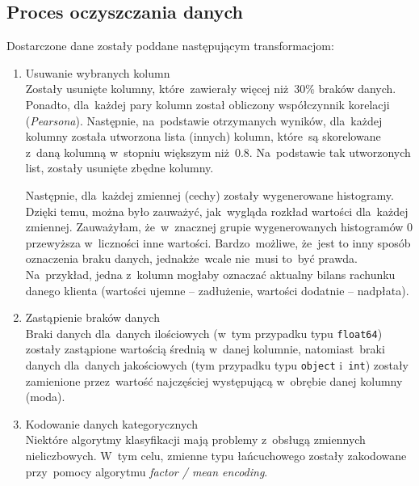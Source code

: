 \documentclass[11pt, a4paper]{article}
\begin{document}
\subsection{Proces oczyszczania danych}
Dostarczone dane zostały poddane następującym transformacjom:
\begin{enumerate}
    \item Usuwanie wybranych kolumn \\
    Zostały usunięte kolumny, które~zawierały więcej niż~$30\%$ braków danych. Ponadto, dla~każdej pary kolumn został obliczony współczynnik korelacji (\textit{Pearsona}). Następnie, na~podstawie otrzymanych wyników, dla~każdej kolumny została utworzona lista (innych) kolumn, które~są skorelowane z~daną kolumną w~stopniu większym niż~$0.8$. Na~podstawie tak utworzonych list, zostały usunięte zbędne kolumny.
    
    Następnie, dla~każdej zmiennej (cechy) zostały wygenerowane histogramy. Dzięki temu, można było zauważyć, jak~wygląda rozkład wartości dla~każdej zmiennej. Zauważyłam, że~w~znacznej grupie wygenerowanych histogramów $0$ przewyższa w~liczności inne wartości. Bardzo~możliwe, że~jest to inny sposób oznaczenia braku danych, jednakże~wcale nie~musi to~być prawda. Na~przykład, jedna z~kolumn mogłaby oznaczać aktualny bilans rachunku danego klienta (wartości ujemne -- zadłużenie, wartości dodatnie -- nadpłata).
    
    \item Zastąpienie braków danych \\
    Braki danych dla~danych ilościowych (w~tym przypadku typu \texttt{float64}) zostały zastąpione wartością średnią w~danej kolumnie, natomiast~braki danych dla~danych jakościowych (tym przypadku typu \texttt{object} i~\texttt{int}) zostały zamienione przez~wartość najczęściej występującą w~obrębie danej kolumny (moda).
    
    \item Kodowanie danych kategorycznych \\
    Niektóre algorytmy klasyfikacji mają problemy z~obsługą zmiennych nieliczbowych. W~tym celu, zmienne typu łańcuchowego zostały zakodowane przy~pomocy algorytmu \textit{factor / mean encoding}.
\end{enumerate}
\end{document}
